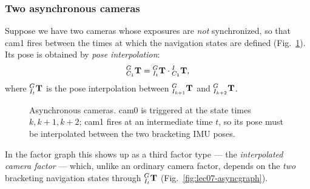 \subsubsection*{Two asynchronous cameras}
\label{sec:lec07-asynccam}

Suppose we have two cameras whose exposures are \emph{not} synchronized, so that cam1 fires between the times at which the navigation states are defined (Fig.~\ref{fig:lec07-asynctime}). Its pose is obtained by \emph{pose interpolation}:
\begin{align}
{}^{G}_{C_1}\boldsymbol{\mathbf{T}} = {}^{G}_{I_t}\boldsymbol{\mathbf{T}}\cdot{}^{I}_{C_1}\boldsymbol{\mathbf{T}},
\end{align}
where ${}^{G}_{I_t}\boldsymbol{\mathbf{T}}$ is the pose interpolation between ${}^{G}_{I_{k+1}}\boldsymbol{\mathbf{T}}$ and ${}^{G}_{I_{k+2}}\boldsymbol{\mathbf{T}}$.

\begin{figure}[H]
\centering
{}
\caption{Asynchronous cameras. cam0 is triggered at the state times $k, k{+}1, k{+}2$; cam1 fires at an intermediate time $t$, so its pose must be interpolated between the two bracketing IMU poses.}
\label{fig:lec07-asynctime}
\end{figure}

\noindent In the factor graph this shows up as a third factor type --- the \emph{interpolated camera factor} --- which, unlike an ordinary camera factor, depends on the \emph{two} bracketing navigation states through ${}^{G}_{I_t}\boldsymbol{\mathbf{T}}$ (Fig.~\ref{fig:lec07-asyncgraph}).

